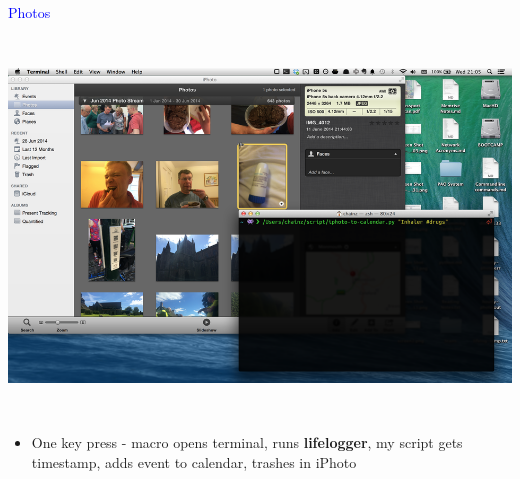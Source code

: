 \documentclass[landscape]{slides}
\begin{document}
\begin{slide}

    \textcolor{blue}{\Large{Photos}}

    \begin{center}
        \includegraphics[height=10cm]{lifelog-iphoto-converter}
    \end{center}

    \begin{itemize}
        \item One key press - macro opens terminal, runs \textbf{lifelogger}, my script gets timestamp, adds event to calendar, trashes in iPhoto

    \end{itemize}

\end{slide}
\end{document}
